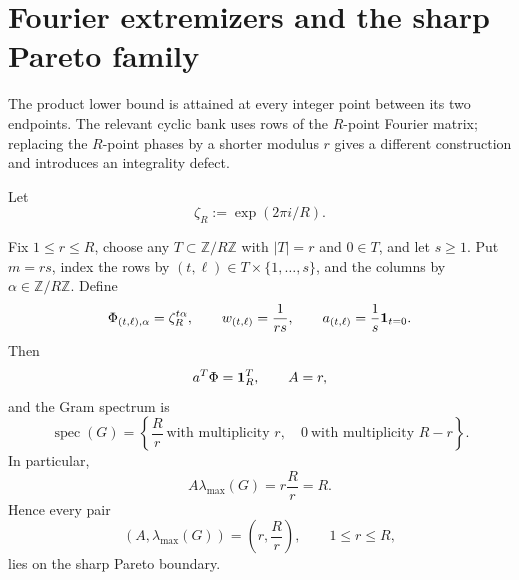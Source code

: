 \section{Fourier extremizers and the sharp Pareto family}
\label{sec:tpc40-Fourier-extremizers}

The product lower bound is attained at every integer point between its two
endpoints.  The relevant cyclic bank uses rows of the \(R\)-point Fourier
matrix; replacing the \(R\)-point phases by a shorter modulus \(r\) gives a
different construction and introduces an integrality defect.

Let
\begin{equation}
 \zeta_R:=\exp(2\pi i/R).
 \label{eq:tpc40-Rth-root}
\end{equation}

\begin{theorem}
\label{thm:tpc40-partial-DFT-extremizers}
Fix \(1\le r\le R\), choose any \(T\subset\mathbb Z/R\mathbb Z\) with
\(|T|=r\) and \(0\in T\), and let \(s\ge1\).  Put \(m=rs\), index the rows
by \((t,\ell)\in T\times\{1,\ldots,s\}\), and the columns by
\(\alpha\in\mathbb Z/R\mathbb Z\).  Define
\begin{equation}
 \Phi_{(t,\ell),\alpha}=\zeta_R^{t\alpha},
 \qquad w_{(t,\ell)}=\frac1{rs},
 \qquad
 a_{(t,\ell)}=\frac1s\mathbf 1_{t=0}.
 \label{eq:tpc40-partial-DFT-bank}
\end{equation}
Then
\begin{equation}
 a^T\Phi=\mathbf 1_R^T,
 \qquad
 A=r,
 \label{eq:tpc40-partial-DFT-recovery}
\end{equation}
and the Gram spectrum is
\begin{equation}
 \operatorname{spec}(G)
 =\left\{\frac Rr\ \text{with multiplicity }r,
          \quad0\ \text{with multiplicity }R-r\right\}.
 \label{eq:tpc40-partial-DFT-spectrum}
\end{equation}
In particular,
\begin{equation}
 A\lambda_{\max}(G)=r\frac Rr=R.
 \label{eq:tpc40-partial-DFT-Pareto-equality}
\end{equation}
Hence every pair
\begin{equation}
 (A,\lambda_{\max}(G))=\left(r,\frac Rr\right),
 \qquad1\le r\le R,
 \label{eq:tpc40-integer-Pareto-family}
\end{equation}
lies on the sharp Pareto boundary.
\end{theorem}

